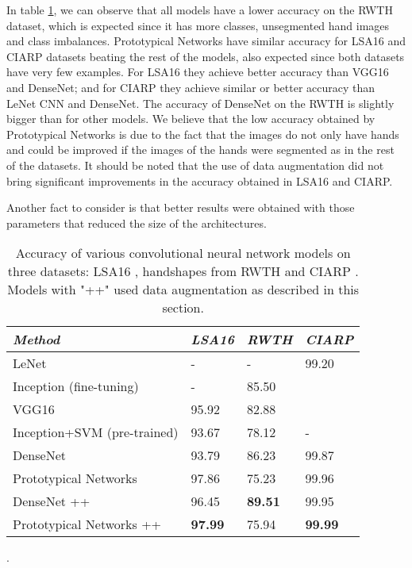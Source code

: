 In table \ref{tab:results}, we can observe that all models have a lower accuracy on the RWTH dataset, which is expected since it has more classes, unsegmented hand images and class imbalances. Prototypical Networks have similar accuracy for LSA16 and CIARP datasets beating the rest of the models, also expected since both datasets have very few examples. For LSA16 they achieve better accuracy than VGG16 and DenseNet; and for CIARP they achieve similar or better accuracy than LeNet CNN and DenseNet. The accuracy of DenseNet on the RWTH is slightly bigger than for other models. We believe that the low accuracy obtained by Prototypical Networks is due to the fact that the images do not only have hands and could be improved if the images of the hands were segmented as in the rest of the datasets. It should be noted that the use of data augmentation did not bring significant improvements in the accuracy obtained in LSA16 and CIARP.

Another fact to consider is that better results were obtained with those parameters that reduced the size of the architectures.

\begin{table}[h!]
\centering
\begin{tabular}{ p{18em} p{7em} p{8em} p{8em}}
\toprule
\emph{Method} & \emph{LSA16} &  \emph{RWTH}  &  \emph{CIARP} \\ \midrule
LeNet \cite{ciarp2018} & - & - & 99.20  \\
Inception (fine-tuning) \cite{koller16} & - & 85.50 \\
VGG16 \cite{quiroga2017study} & 95.92 & 82.88 \\
Inception+SVM (pre-trained) \cite{quiroga2017study} &  93.67 & 78.12 & - \\
DenseNet  & 93.79 & 86.23 & 99.87 \\
Prototypical Networks  & 97.86 & 75.23 & 99.96 \\
DenseNet ++  & 96.45 & \textbf{89.51} & 99.95 \\
Prototypical Networks ++ & \textbf{97.99} & 75.94 & \textbf{99.99}  \\
\bottomrule
\end{tabular}
\caption{Accuracy of various convolutional neural network models on three datasets: LSA16 \cite{Ronchetti2016}, handshapes from RWTH \cite{koller16:deephand} and CIARP \cite{ciarp2018}. Models with "++" used data augmentation as described in this section. \label{tab:results}}.
\end{table}

